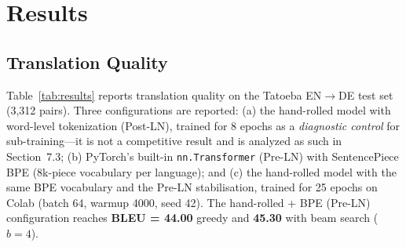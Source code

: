 \section{Results}

\subsection{Translation Quality}

Table~\ref{tab:results} reports translation quality on the Tatoeba EN$\rightarrow$DE test set (3,312 pairs). Three configurations are reported: (a) the hand-rolled model with word-level tokenization (Post-LN), trained for 8 epochs as a \textit{diagnostic control} for sub-training---it is not a competitive result and is analyzed as such in Section~7.3; (b) PyTorch's built-in \texttt{nn.Transformer} (Pre-LN) with SentencePiece BPE (8k-piece vocabulary per language); and (c) the hand-rolled model with the same BPE vocabulary and the Pre-LN stabilisation, trained for 25 epochs on Colab (batch 64, warmup 4000, seed 42). The hand-rolled + BPE (Pre-LN) configuration reaches \textbf{BLEU = 44.00} greedy and \textbf{45.30} with beam search ($b=4$).

\begin{table}[h]
\centering
\footnotesize
\setlength{\tabcolsep}{2.5pt}
\caption{Results on the Tatoeba EN$\rightarrow$DE test set ($n = 3{,}312$). BLEU and chrF2 are corpus-level sacrebleu scores. The first row is the word-level Post-LN diagnostic/control run (BLEU = 0.38, BP = 0.593; Section~7.3), not a competitive configuration. The hand-rolled + BPE (Pre-LN) row is the strongest configuration tested: greedy BLEU = 44.00 (71.3/48.9/37.3/29.3, BP = 0.995) and beam=4 BLEU = 45.30 (72.4/50.7/39.0/30.9, BP = 0.987). The baseline differs from the hand-rolled run in batch size (32 vs.\ 64) and warmup (2{,}000 vs.\ 4{,}000), so the 5.7-point greedy gap is attributable to the combination of implementation and training schedule rather than to the implementation alone; a fully matched-hyperparameter comparison is left as future work (Section~6.7).}
\label{tab:results}
\end{table}

